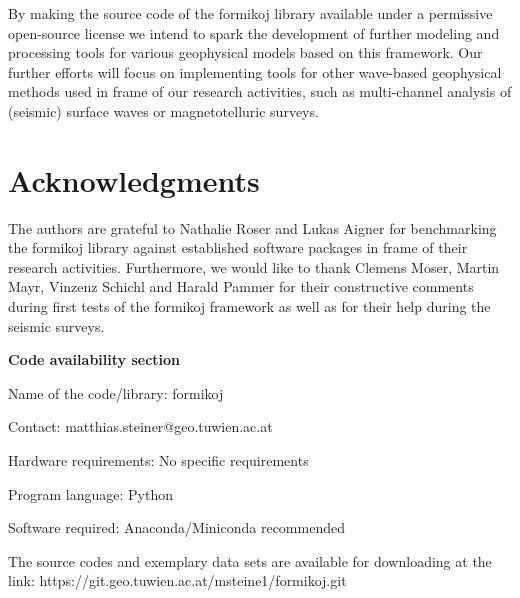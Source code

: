 \documentclass[a4paper,fleqn]{cas-sc}
\begin{document}
By making the source code of the formikoj library available under a permissive open-source license we intend to spark the development of further modeling and processing tools for various geophysical models based on this framework. Our further efforts will focus on implementing tools for other wave-based geophysical methods used in frame of our research activities, such as multi-channel analysis of (seismic) surface waves or magnetotelluric surveys. 

\section{Acknowledgments}

The authors are grateful to Nathalie Roser and Lukas Aigner for benchmarking the formikoj library against established software packages in frame of their research activities. Furthermore, we would like to thank Clemens Moser, Martin Mayr, Vinzenz Schichl and Harald Pammer for their constructive comments during first tests of the formikoj framework as well as for their help during the seismic surveys.

\newpage

\textbf{Code availability section}

Name of the code/library: formikoj

Contact: matthias.steiner@geo.tuwien.ac.at

Hardware requirements: No specific requirements

Program language: Python
 
Software required: Anaconda/Miniconda recommended

The source codes and exemplary data sets are available for downloading at the link:
https://git.geo.tuwien.ac.at/msteine1/formikoj.git


 
\end{document}

